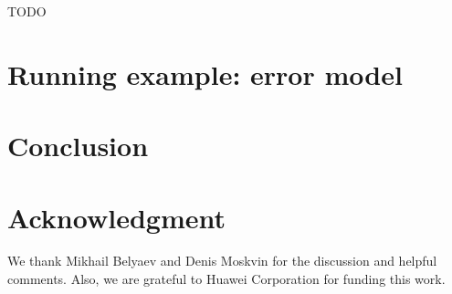 \documentclass[conference]{IEEEtran}
\begin{document}
    TODO \cite{convent2020doo}\cite{tang2024modal}



    \section{Running example: error model}



    \section{Conclusion}



    \section*{Acknowledgment}

    We thank Mikhail Belyaev and Denis Moskvin for the discussion and helpful comments.
    Also, we are grateful to Huawei Corporation for funding this work.



    
    
\end{document}
